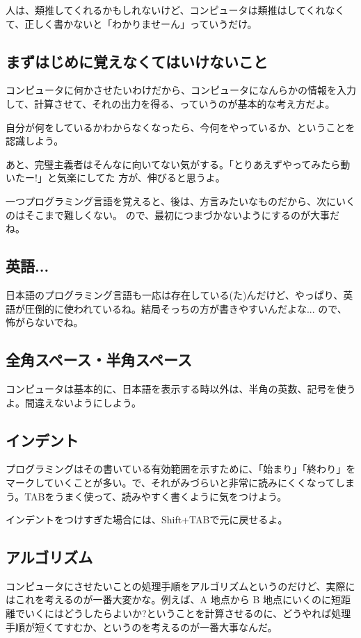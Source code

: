 \documentclass[mingoth,11pt,a4j,uplatex]{jsarticle}
\begin{document}
人は、類推してくれるかもしれないけど、コンピュータは類推はしてくれなくて、正しく書かないと「わかりませーん」っていうだけ。

\subsection{まずはじめに覚えなくてはいけないこと}
コンピュータに何かさせたいわけだから、コンピュータになんらかの情報を入力して、計算させて、それの出力を得る、っていうのが基本的な考え方だよ。

自分が何をしているかわからなくなったら、今何をやっているか、ということを認識しよう。

あと、完璧主義者はそんなに向いてない気がする。「とりあえずやってみたら動いたー!」と気楽にしてた 方が、伸びると思うよ。

一つプログラミング言語を覚えると、後は、方言みたいなものだから、次にいくのはそこまで難しくない。 ので、最初につまづかないようにするのが大事だね。

\subsection{英語...}
日本語のプログラミング言語も一応は存在している(た)んだけど、やっぱり、英語が圧倒的に使われているね。結局そっちの方が書きやすいんだよな... ので、怖がらないでね。

\subsection{全角スペース・半角スペース}
コンピュータは基本的に、日本語を表示する時以外は、半角の英数、記号を使うよ。間違えないようにしよう。

\subsection{インデント}
プログラミングはその書いている有効範囲を示すために、「始まり」「終わり」をマークしていくことが多い。で、それがみづらいと非常に読みにくくなってしまう。TABをうまく使って、読みやすく書くように気をつけよう。

インデントをつけすぎた場合には、Shift+TABで元に戻せるよ。

\subsection{アルゴリズム}
コンピュータにさせたいことの処理手順をアルゴリズムというのだけど、実際にはこれを考えるのが一番大変かな。例えば、A 地点から B 地点にいくのに短距離でいくにはどうしたらよいか?ということを計算させるのに、どうやれば処理手順が短くてすむか、というのを考えるのが一番大事なんだ。
\end{document}
